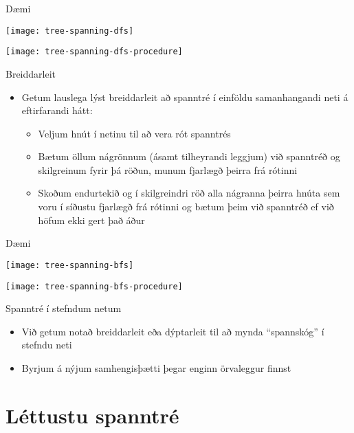 \documentclass[handout]{beamer}
\begin{document}
\begin{frame}{Dæmi}
\begin{center}
\texttt{[image: tree-spanning-dfs]}

\pause
\texttt{[image: tree-spanning-dfs-procedure]}
\end{center}

\end{frame}

\begin{frame}{Breiddarleit}
\begin{itemize}
 \item Getum lauslega lýst breiddarleit að spanntré í einföldu samanhangandi neti á eftirfarandi hátt:
 \begin{itemize}
  \item Veljum hnút í netinu til að vera rót spanntrés
  \item Bætum öllum nágrönnum (ásamt tilheyrandi leggjum) við spanntréð og skilgreinum fyrir þá röðun, munum fjarlægð þeirra frá rótinni
  \item Skoðum endurtekið og í skilgreindri röð alla nágranna þeirra hnúta sem voru í síðustu fjarlægð frá rótinni og bætum þeim við spanntréð ef við höfum ekki gert það áður
 \end{itemize}
\end{itemize}
\end{frame}

\begin{frame}{Dæmi}
\begin{center}
\texttt{[image: tree-spanning-bfs]}

\pause
\texttt{[image: tree-spanning-bfs-procedure]}
\end{center}

\end{frame}

\begin{frame}{Spanntré í stefndum netum}
\begin{itemize}
 \item Við getum notað breiddarleit eða dýptarleit til að mynda ``spannskóg'' í stefndu neti
 \item Byrjum á nýjum samhengisþætti þegar enginn örvaleggur finnst
\end{itemize}
\end{frame}

\section{Léttustu spanntré}
\end{document}
